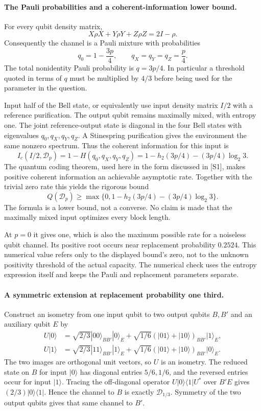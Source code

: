 \documentclass[11pt]{article}
\begin{document}
\paragraph{The Pauli probabilities and a coherent-information lower bound.}
For every qubit density matrix,
\[
 X\rho X+Y\rho Y+Z\rho Z=2I-\rho.
\]
Consequently the channel is a Pauli mixture with probabilities
\[
 q_0=1-\frac{3p}{4},\qquad q_X=q_Y=q_Z=\frac p4.
\]
The total nonidentity Pauli probability is $q=3p/4$. In particular
a threshold quoted in terms of $q$ must be multiplied by $4/3$
before being used for the parameter in the question.

Input half of the Bell state, or equivalently use input density matrix
$I/2$ with a reference purification. The output qubit remains maximally
mixed, with entropy one. The joint reference-output state is diagonal
in the four Bell states with eigenvalues $q_0,q_X,q_Y,q_Z$. A Stinespring
purification gives the environment the same nonzero spectrum. Thus the
coherent information for this input is
\begin{equation}\label{a273:hashing}
 I_c(I/2,\mathcal D_p)=
 1-H(q_0,q_X,q_Y,q_Z)
 =1-h_2(3p/4)-(3p/4)\log_2 3.
\end{equation}
The quantum coding theorem, used here in the form discussed in [S1],
makes positive coherent information an achievable asymptotic rate.
Together with the trivial zero rate this yields the rigorous bound
\[
 Q(\mathcal D_p)\ge
 \max\{0,1-h_2(3p/4)-(3p/4)\log_2 3\}.
\]
The formula is a lower bound, not a converse. No claim is made that
the maximally mixed input optimizes every block length.

At $p=0$ it gives one, which is also the maximum possible rate for a
noiseless qubit channel. Its positive root occurs near replacement
probability $0.2524$. This numerical value refers only to the displayed
bound's zero, not to the unknown positivity threshold of the actual
capacity. The numerical check uses the entropy expression itself and
keeps the Pauli and replacement parameters separate.

\paragraph{A symmetric extension at replacement probability one third.}
Construct an isometry from one input qubit to two output qubits $B,B'$
and an auxiliary qubit $E$ by
\[
 \begin{split}
 U|0\rangle&=\sqrt{2/3}|00\rangle_{BB'}|0\rangle_E
       +\sqrt{1/6}(|01\rangle+|10\rangle)_{BB'}|1\rangle_E,\\
 U|1\rangle&=\sqrt{2/3}|11\rangle_{BB'}|1\rangle_E
       +\sqrt{1/6}(|01\rangle+|10\rangle)_{BB'}|0\rangle_E.
 \end{split}
\]
The two images are orthogonal unit vectors, so $U$ is an isometry.
The reduced state on $B$ for input $|0\rangle$ has diagonal entries
$5/6,1/6$, and the reversed entries occur for input $|1\rangle$.
Tracing the off-diagonal operator $U|0\rangle\langle1|U^*$ over
$B'E$ gives $(2/3)|0\rangle\langle1|$. Hence the channel to $B$ is
exactly $\mathcal D_{1/3}$. Symmetry of the two output qubits gives
that same channel to $B'$.
\end{document}
